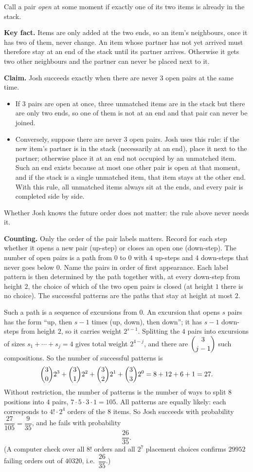 Call a pair \emph{open} at some moment if exactly one of its two items is already in the stack.

\textbf{Key fact.} Items are only added at the two ends, so an item's neighbours, once it has two of them, never change. An item whose partner has not yet arrived must therefore stay at an end of the stack until its partner arrives. Otherwise it gets two other neighbours and the partner can never be placed next to it.

\textbf{Claim.} Josh succeeds exactly when there are never $3$ open pairs at the same time.
\begin{itemize}
\item If $3$ pairs are open at once, three unmatched items are in the stack but there are only two ends, so one of them is not at an end and that pair can never be joined.
\item Conversely, suppose there are never $3$ open pairs. Josh uses this rule: if the new item's partner is in the stack (necessarily at an end), place it next to the partner; otherwise place it at an end not occupied by an unmatched item. Such an end exists because at most one other pair is open at that moment, and if the stack is a single unmatched item, that item stays at the other end. With this rule, all unmatched items always sit at the ends, and every pair is completed side by side.
\end{itemize}
Whether Josh knows the future order does not matter: the rule above never needs it.

\textbf{Counting.} Only the order of the pair labels matters. Record for each step whether it opens a new pair (up-step) or closes an open one (down-step). The number of open pairs is a path from $0$ to $0$ with $4$ up-steps and $4$ down-steps that never goes below $0$. Name the pairs in order of first appearance. Each label pattern is then determined by the path together with, at every down-step from height $2$, the choice of which of the two open pairs is closed (at height $1$ there is no choice). The successful patterns are the paths that stay at height at most $2$.

Such a path is a sequence of excursions from $0$. An excursion that opens $s$ pairs has the form ``up, then $s-1$ times (up, down), then down''; it has $s-1$ down-steps from height $2$, so it carries weight $2^{s-1}$. Splitting the $4$ pairs into excursions of sizes $s_1+\cdots+s_j=4$ gives total weight $2^{4-j}$, and there are $\dbinom{3}{j-1}$ such compositions. So the number of successful patterns is
\[
\dbinom30 2^3+\dbinom31 2^2+\dbinom32 2^1+\dbinom33 2^0=8+12+6+1=27 .
\]
Without restriction, the number of patterns is the number of ways to split $8$ positions into $4$ pairs, $7\cdot5\cdot3\cdot1=105$. All patterns are equally likely: each corresponds to $4!\cdot2^4$ orders of the $8$ items. So Josh succeeds with probability $\dfrac{27}{105}=\dfrac{9}{35}$, and he fails with probability
\[
\boxed{\dfrac{26}{35}} .
\]
(A computer check over all $8!$ orders and all $2^7$ placement choices confirms $29952$ failing orders out of $40320$, i.e.\ $\dfrac{26}{35}$.)
